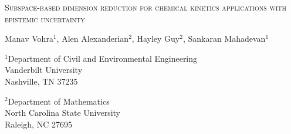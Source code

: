 \begin{center}
\textsc{Subspace-based dimension reduction for chemical kinetics applications with epistemic uncertainty}

\bigskip 
\bigskip 

Manav Vohra$^{1}$, Alen Alexanderian$^{2}$, Hayley Guy$^{2}$, Sankaran Mahadevan$^{1}$

\bigskip
\bigskip

\normalsize
$^1$Department of Civil and Environmental Engineering\\
Vanderbilt University\\
Nashville, TN 37235\\

\bigskip

$^2$Department of Mathematics\\
North Carolina State University\\
Raleigh, NC 27695\\

%
\end{center}
%
%
%


